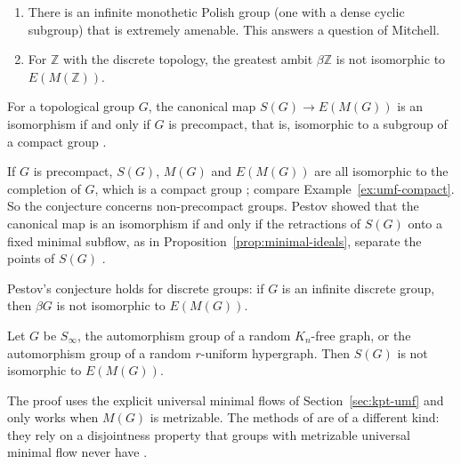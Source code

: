 \begin{theorem}\label{thm:glasner-monothetic}
\begin{enumerate}
\item There is an infinite monothetic Polish group (one with a dense cyclic
  subgroup) that is extremely amenable. This answers a question of Mitchell.
\item For $\mathbb{Z}$ with the discrete topology, the greatest ambit
  $\beta\mathbb{Z}$ is not isomorphic to $E(M(\mathbb{Z}))$.
\end{enumerate}
\end{theorem}

\begin{conjecture}[Pestov]\label{conj:pestov}
For a topological group $G$, the canonical map $S(G)\to E(M(G))$ is an
isomorphism if and only if $G$ is precompact, that is, isomorphic to a
subgroup of a compact group \cite[page~4163]{Pestov1998}.
\end{conjecture}

\begin{remark}\label{rem:pestov-conjecture}
If $G$ is precompact, $S(G)$, $M(G)$ and $E(M(G))$ are all isomorphic to the
completion of $G$, which is a compact group \cite{BartosovaZucker2019}; compare
Example~\ref{ex:umf-compact}. So the conjecture concerns non-precompact
groups. Pestov showed that the canonical map is an isomorphism if and only if
the retractions of $S(G)$ onto a fixed minimal subflow, as in
Proposition~\ref{prop:minimal-ideals}, separate the points of $S(G)$
\cite{BartosovaZucker2019}.
\end{remark}

\begin{theorem}\label{thm:gtwz}
Pestov's conjecture holds for discrete groups: if $G$ is an infinite discrete
group, then $\beta G$ is not isomorphic to $E(M(G))$.
\end{theorem}

\begin{theorem}\label{thm:bartosova-zucker}
Let $G$ be $S_\infty$, the automorphism group of a random $K_n$-free graph, or
the automorphism group of a random $r$-uniform hypergraph. Then $S(G)$ is not
isomorphic to $E(M(G))$.
\end{theorem}

\begin{remark}\label{rem:bartosova-zucker}
The proof uses the explicit universal minimal flows of
Section~\ref{sec:kpt-umf} and only works when $M(G)$ is metrizable. The
methods of \cite{GTWZ2021} are of a different kind: they rely on a
disjointness property that groups with metrizable universal minimal flow
never have \cite{BartosovaZucker2019}.
\end{remark}
